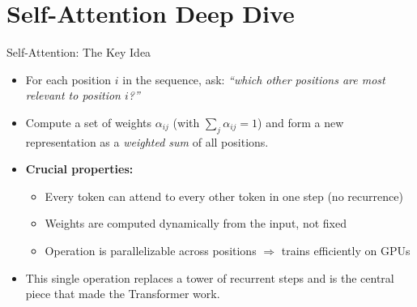 \section{Self-Attention Deep Dive}

\begin{frame}{Self-Attention: The Key Idea}
\begin{itemize}
\item For each position $i$ in the sequence, ask: \emph{``which other positions are most relevant to position $i$?''}

\medskip
\item Compute a set of weights $\alpha_{ij}$ (with $\sum_j \alpha_{ij}=1$) and form a new representation as a \emph{weighted sum} of all positions.

\medskip
\item \textbf{Crucial properties:}
\begin{itemize}
    \item Every token can attend to every other token in one step (no recurrence)
    \item Weights are computed dynamically from the input, not fixed
    \item Operation is parallelizable across positions $\Rightarrow$ trains efficiently on GPUs
\end{itemize}

\medskip
\item This single operation replaces a tower of recurrent steps and is the central piece that made the Transformer work.
\end{itemize}
\end{frame}

